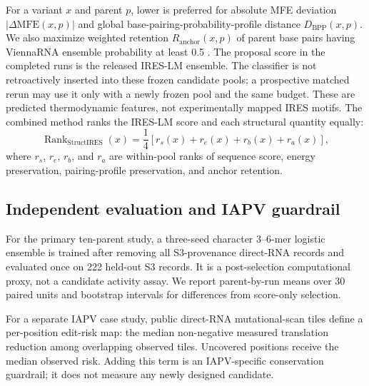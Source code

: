 For a variant $x$ and parent $p$, lower is preferred for absolute MFE deviation
$|\Delta \mathrm{MFE}(x,p)|$ and global base-pairing-probability-profile
distance $D_{\mathrm{BPP}}(x,p)$. We also maximize weighted retention
$R_{\mathrm{anchor}}(x,p)$ of parent base pairs having ViennaRNA ensemble
probability at least 0.5 \cite{lorenz2011viennarna}. The proposal score in the
completed runs is the released IRES-LM ensemble. The classifier is not
retroactively inserted into these frozen candidate pools; a prospective
matched rerun may use it only with a newly frozen pool and the same budget.
These are predicted thermodynamic features, not experimentally mapped IRES
motifs. The combined method ranks the
IRES-LM score and each structural quantity equally:
\begin{equation}
\operatorname{Rank}_{\mathrm{StructIRES}}(x)=
\frac{1}{4}\left[r_s(x)+r_e(x)+r_b(x)+r_a(x)\right],
\end{equation}
where $r_s$, $r_e$, $r_b$, and $r_a$ are within-pool ranks of sequence score,
energy preservation, pairing-profile preservation, and anchor retention.

\subsection{Independent evaluation and IAPV guardrail}
For the primary ten-parent study, a three-seed character 3--6-mer logistic
ensemble is trained after removing all S3-provenance direct-RNA records and
evaluated once on 222 held-out S3 records. It is a post-selection computational
proxy, not a candidate activity assay. We report parent-by-run means over 30
paired units and bootstrap intervals for differences from score-only selection.

For a separate IAPV case study, public direct-RNA mutational-scan tiles
\cite{may2026irestrappr} define a per-position edit-risk map: the median
non-negative measured translation reduction among overlapping observed tiles.
Uncovered positions receive the median observed risk. Adding this term is an
IAPV-specific conservation guardrail; it does not measure any newly designed
candidate.
